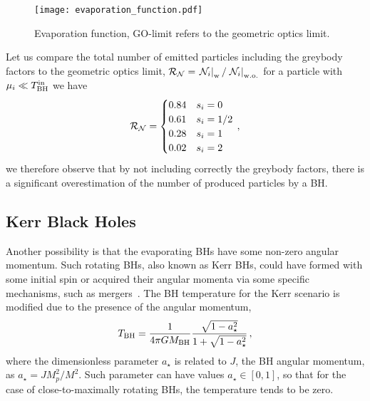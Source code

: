 \documentclass[aps,prd,reprint,twocolumn,preprintnumbers,floatfix,nofootinbib]{revtex4-1}
\newcommand{\TBHi}{T_{\rm BH}^{\rm in}}
\newcommand{\MPL}{M_p}
\begin{document}
\begin{figure}
    \texttt{[image: evaporation\_function.pdf]}
    \caption{Evaporation function, GO-limit refers to the geometric optics limit.}
    \label{fig:evaporation_func}
\end{figure}
Let us compare the total number of emitted particles including the greybody factors to the geometric optics limit, $\mathcal R_{\cal N} = \left.\mathcal N_i\right|_{\rm w}/\left.\mathcal N_i\right|_{\rm w.o.}$ for a particle with $\mu_i\ll \TBHi$ we have
\begin{equation}
    \mathcal{R}_{\cal N}=\begin{cases}
    0.84 & s_i=0\\
    0.61 & s_i=1/2 \\
    0.28 & s_i=1\\
    0.02 & s_i=2
    \end{cases}\,,
\end{equation}
we therefore observe that by not including correctly the greybody factors, there is a significant overestimation of the number of produced particles by a BH.

\subsection{Kerr Black Holes}\label{subs:KBH}

Another possibility is that the evaporating BHs have some non-zero angular momentum. Such rotating BHs, also known as Kerr BHs, could have formed with some initial spin or acquired their angular momenta via some specific mechanisms, such as mergers~\cite{Buonanno:2007sv,Kesden:2008ga,Tichy:2008du}. The BH temperature for the Kerr scenario is modified due to the presence of the angular momentum, 
\begin{align}
 T_{\rm BH} = \frac{1}{4\pi G M_{\rm BH}}\frac{\sqrt{1-a_\star^2}}{1+\sqrt{1-a_\star^2}}\,,
\end{align}
where the dimensionless parameter $a_\star$ is related to $J$, the BH angular momentum, as $a_\star = J \MPL^2/M^2$. Such parameter can have values $a_\star\in [0,1]$, so that for the case of close-to-maximally rotating BHs, the temperature tends to be zero.
\end{document}
